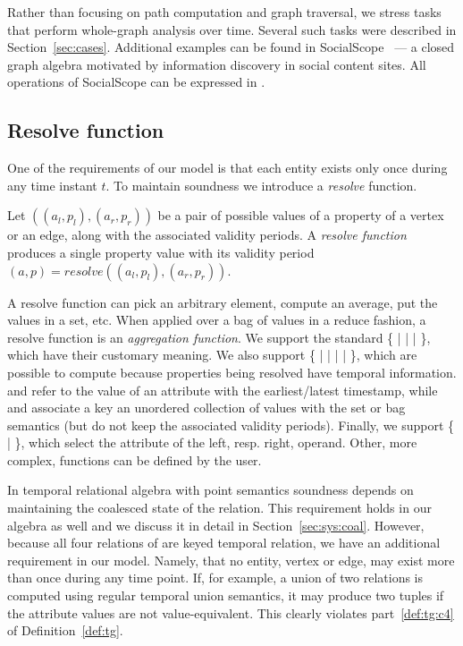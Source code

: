 Rather than focusing on path computation and graph traversal, we
stress tasks that perform whole-graph analysis over time.  Several
such tasks were described in Section~\ref{sec:cases}.  Additional
examples can be found in SocialScope~\cite{Amer-Yahia2009} --- a
closed graph algebra motivated by information discovery in social
content sites.  All operations of SocialScope can be expressed in
\ql. 

\subsection{Resolve function}
\label{sec:algebra:integrity}

One of the requirements of our model is that each entity exists only
once during any time instant $t$.  To maintain soundness we introduce
a {\em resolve} function.

\begin{definition}
Let $((a_l,p_l),(a_r,p_r))$ be a pair of possible values of a property
of a vertex or an edge, along with the associated validity periods.  A
{\em resolve function} produces a single property value with its
validity period $(a,p) = resolve((a_l,p_l), (a_r,p_r))$.
\end{definition}

A resolve function can pick an arbitrary element, compute an average,
put the values in a set, etc.  When applied over a bag of values in a
reduce fashion, a resolve function is an {\em aggregation function}.
We support the standard \{  |  |  |
 \}, which have their customary meaning.  We also support
\{  |  |  |  |
 \}, which are possible to compute because properties being
resolved have temporal information.   and 
refer to the value of an attribute with the earliest/latest timestamp,
while  and  associate a key an unordered
collection of values with the set or bag semantics (but do not keep
the associated validity periods).  Finally, we support \{ 
|  \}, which select the attribute of the left,
resp. right, operand.  Other, more complex, functions can be defined
by the user.

In temporal relational algebra with point semantics soundness depends
on maintaining the coalesced state of the relation.  This requirement
holds in our algebra as well and we discuss it in detail in
Section~\ref{sec:sys:coal}.  However, because all four relations of
\tve are keyed temporal relation, we have an additional requirement in
our model.  Namely, that no entity, vertex or edge, may exist more than
once during any time point.  If, for example, a union of two \tav
relations is computed using regular temporal union semantics, it may
produce two tuples if the attribute values are not value-equivalent.
This clearly violates part~\ref{def:tg:c4} of Definition~\ref{def:tg}.

